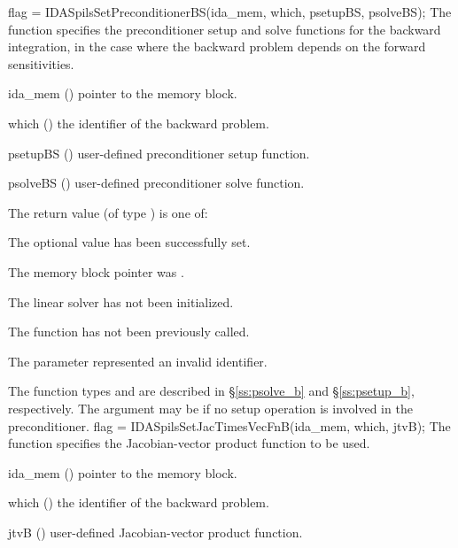 {
  flag = IDASpilsSetPreconditionerBS(ida\_mem, which, psetupBS, psolveBS);
}
{
  The function  specifies the preconditioner
  setup and solve functions for the backward integration, in the case
  where the backward problem depends on the forward sensitivities.
}
{
  \begin{args}[psetupBS]
  \item[ida\_mem] ()
    pointer to the {\idas} memory block.
  \item[which] ()
    the identifier of the backward problem.
  \item[psetupBS] ()
    user-defined preconditioner setup function.
  \item[psolveBS] ()
    user-defined preconditioner solve function.
  \end{args}
}
{
  The return value  (of type ) is one of:
  \begin{args}
  \item[\Id{IDASPILS\_SUCCESS}] 
    The optional value has been successfully set.
  \item[\Id{IDASPILS\_MEM\_NULL}]
    The  memory block pointer was .
  \item[\Id{IDASPILS\_LMEM\_NULL}]
    The {\idaspils} linear solver has not been initialized.
  \item[\Id{IDASPILS\_NO\_ADJ}]
    The function  has not been previously called.
  \item[\Id{IDASPILS\_ILL\_INPUT}]
    The parameter  represented an invalid identifier.
  \end{args}
}
{
   The function types  and  are
   described in \S\ref{ss:psolve_b} and \S\ref{ss:psetup_b}, respectively.
   The  argument may be  if no setup operation is involved
   in the preconditioner.
}
{
  flag = IDASpilsSetJacTimesVecFnB(ida\_mem, which, jtvB);
}
{
  The function  specifies the Jacobian-vector 
  product function to be used.
}
{
  \begin{args}
  \item[ida\_mem] ()
    pointer to the {\idas} memory block.
  \item[which] ()
    the identifier of the backward problem.
  \item[jtvB] ()
    user-defined Jacobian-vector product function.
  \end{args}
}
